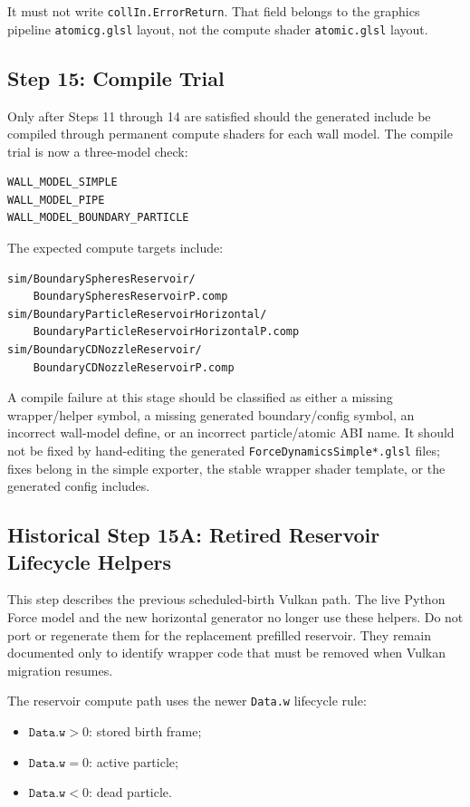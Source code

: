 It must not write \texttt{collIn.ErrorReturn}.  That field belongs to the
graphics pipeline \texttt{atomicg.glsl} layout, not the compute shader
\texttt{atomic.glsl} layout.

\subsection{Step 15: Compile Trial}

Only after Steps 11 through 14 are satisfied should the generated include be
compiled through permanent compute shaders for each wall model.  The compile
trial is now a three-model check:
\begin{verbatim}
WALL_MODEL_SIMPLE
WALL_MODEL_PIPE
WALL_MODEL_BOUNDARY_PARTICLE
\end{verbatim}

The expected compute targets include:
\begin{verbatim}
sim/BoundarySpheresReservoir/
    BoundarySpheresReservoirP.comp
sim/BoundaryParticleReservoirHorizontal/
    BoundaryParticleReservoirHorizontalP.comp
sim/BoundaryCDNozzleReservoir/
    BoundaryCDNozzleReservoirP.comp
\end{verbatim}

A compile failure at this stage should be classified as either a missing
wrapper/helper symbol, a missing generated boundary/config symbol, an
incorrect wall-model define, or an incorrect particle/atomic ABI name.  It
should not be fixed by hand-editing the generated
\texttt{ForceDynamicsSimple*.glsl} files; fixes belong in the simple exporter,
the stable wrapper shader template, or the generated config includes.

\subsection{Historical Step 15A: Retired Reservoir Lifecycle Helpers}

This step describes the previous scheduled-birth Vulkan path.  The live
Python Force model and the new horizontal generator no longer use these
helpers.  Do not port or regenerate them for the replacement prefilled
reservoir.  They remain documented only to identify wrapper code that must be
removed when Vulkan migration resumes.

The reservoir compute path uses the newer \texttt{Data.w} lifecycle rule:
\begin{itemize}
    \item \(\texttt{Data.w} > 0\): stored birth frame;
    \item \(\texttt{Data.w} = 0\): active particle;
    \item \(\texttt{Data.w} < 0\): dead particle.
\end{itemize}

